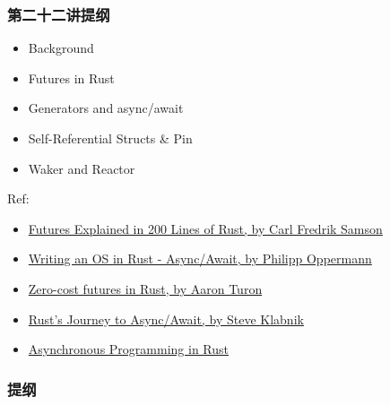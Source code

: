 \begin{frame}
\frametitle{第二十二讲提纲} %

\large
\begin{itemize}
    \item Background
    \item Futures in Rust
    \item Generators and async/await
    \item Self-Referential Structs \& Pin
    \item Waker and Reactor
\end{itemize}

\tiny
Ref:
    \begin{itemize}
        \item \href{https://cfsamson.github.io/books-futures-explained/}{Futures Explained in 200 Lines of Rust, by Carl Fredrik Samson}
        \item \href{https://os.phil-opp.com/async-await/}{Writing an OS in Rust - Async/Await, by Philipp Oppermann}
        \item \href{https://aturon.github.io/tech/2016/08/11/futures/}{Zero-cost futures in Rust, by Aaron Turon}
        \item \href{https://www.infoq.com/presentations/rust-2019/}{Rust’s Journey to Async/Await, by Steve Klabnik}
        \item \href{https://rust-lang.github.io/async-book/index.html}{Asynchronous Programming in Rust}
    \end{itemize}

\end{frame}
% 
\begin{frame}
    \frametitle{提纲} %
    \tableofcontents %

\end{frame}
